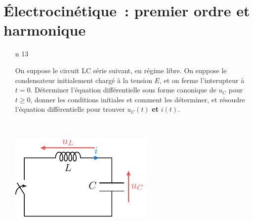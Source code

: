 \documentclass[a4paper, 10pt, final, garamond]{book}
\begin{document}
\setcounter{chapter}{4}


\chapter{Électrocinétique~: premier ordre et harmonique}

\begin{enumerate}[label=\sqenumi, leftmargin=10pt]
	\item[n]{13}%
	      \noindent
	      \begin{minipage}[t]{.69\linewidth}
		      On suppose le circuit LC série suivant, en régime libre. On suppose le
		      condensateur initialement chargé à la tension $E$, et on ferme
		      l'interupteur à $t=0$. Déterminer l'équation différentielle sous forme
		      canonique de $u_C$ pour $t \geq 0$, donner les conditions initiales et
		      comment les déterminer, et résoudre l'équation différentielle pour
		      trouver $u_C(t)$ \textbf{et} $i(t)$.
	      \end{minipage}
	      \hfill
	      \begin{minipage}[t]{.29\linewidth}
		      ~
		      \vspace{-35pt}
		      \begin{center}
			      \includegraphics[width=.8\linewidth]{lc_descendant-intens}
		      \end{center}
	      \end{minipage}
	      \begin{isd}[sidebyside align=top]
		      \vspace{-15pt}
\end{isd}
\end{enumerate}
\end{document}
